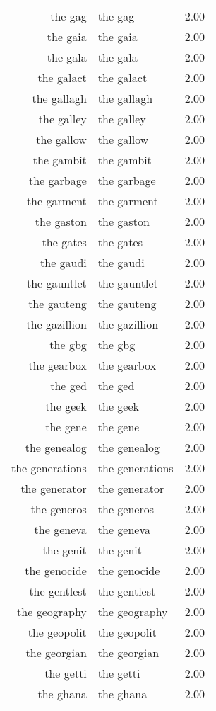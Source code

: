 \begin{table}[ht]
\begin{tabular}{rlr}
  the gag & the gag & 2.00 \\ 
  the gaia & the gaia & 2.00 \\ 
  the gala & the gala & 2.00 \\ 
  the galact & the galact & 2.00 \\ 
  the gallagh & the gallagh & 2.00 \\ 
  the galley & the galley & 2.00 \\ 
  the gallow & the gallow & 2.00 \\ 
  the gambit & the gambit & 2.00 \\ 
  the garbage & the garbage & 2.00 \\ 
  the garment & the garment & 2.00 \\ 
  the gaston & the gaston & 2.00 \\ 
  the gates & the gates & 2.00 \\ 
  the gaudi & the gaudi & 2.00 \\ 
  the gauntlet & the gauntlet & 2.00 \\ 
  the gauteng & the gauteng & 2.00 \\ 
  the gazillion & the gazillion & 2.00 \\ 
  the gbg & the gbg & 2.00 \\ 
  the gearbox & the gearbox & 2.00 \\ 
  the ged & the ged & 2.00 \\ 
  the geek & the geek & 2.00 \\ 
  the gene & the gene & 2.00 \\ 
  the genealog & the genealog & 2.00 \\ 
  the generations & the generations & 2.00 \\ 
  the generator & the generator & 2.00 \\ 
  the generos & the generos & 2.00 \\ 
  the geneva & the geneva & 2.00 \\ 
  the genit & the genit & 2.00 \\ 
  the genocide & the genocide & 2.00 \\ 
  the gentlest & the gentlest & 2.00 \\ 
  the geography & the geography & 2.00 \\ 
  the geopolit & the geopolit & 2.00 \\ 
  the georgian & the georgian & 2.00 \\ 
  the getti & the getti & 2.00 \\ 
  the ghana & the ghana & 2.00 \\ 

\end{tabular}
\end{table}
